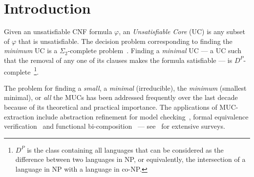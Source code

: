 \documentclass[twoside,11pt]{article}
\begin{document}

\section{Introduction}

Given an unsatisfiable CNF formula $\varphi$, an \emph{Unsatisfiable
Core} (UC) is any
subset of $\varphi$ that is unsatisfiable. The decision problem corresponding
to finding the \emph{minimum} UC is a $\Sigma_2$-complete problem~\cite{G06}.
Finding a \emph{minimal} UC --- a UC such that the removal of any one of its
clauses makes the formula satisfiable --- is
$D^P$-complete~\cite{PAPA88}\footnote{$D^P$ is the class containing all
languages that can be considered as the difference between two languages in
NP, or equivalently, the intersection of a language in NP with a language in
co-NP.}.

The problem for finding a \emph{small}, a \emph{minimal} (irreducible), the \emph{minimum} (smallest minimal), or \emph{all} the MUCs has been addressed frequently over the last decade~\cite{ZM03,GN03,BRUNI03,OH04,LYNCE04,DBLP:conf/ausai/ZhangLS06,GKS06,DHN06,SY07,B08,DBLP:conf/lpar/AsinNOR08,LS08,DBLP:conf/sat/MaarenW08,GKS08,DBLP:journals/eor/GregoireMP09,DBLP:conf/frocos/PietteHS09,DGHP09,LMLAMS09,DBLP:journals/jsw/ZhangSL09,NadelPhd,DBLP:conf/ismvl/Silva10,dvcon10am,RS11,BM11,SL11,BelovM12,DBLP:conf/cp/Wieringa12,DBLP:journals/aicom/BelovLM12,DBLP:conf/date/Belov0MM13,DBLP:conf/cav/Marques-SilvaJB13,LB13,NRS13,RyvchinPhd} because of its theoretical and practical importance. The applications of MUC-extraction include abstraction refinement for model checking~\cite{MA03,GGYA03,DBLP:conf/date/Belov0MM13}, formal equivalence verification~\cite{KKB09,dvcon10am} and functional bi-composition~\cite{DBLP:conf/dac/LeeJH08,DBLP:conf/vlsi/0001M11} --- see~\cite{DBLP:conf/ismvl/Silva10,N10} for extensive surveys.
\end{document}
